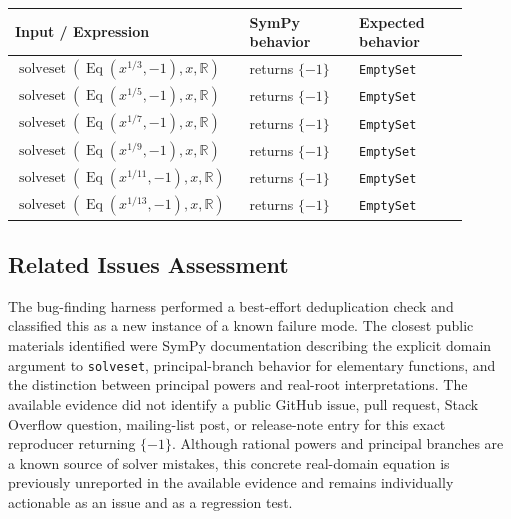 \documentclass[11pt]{article}
\begin{document}
\begin{center}
\small
\renewcommand{\arraystretch}{1.3}
\begin{tabular}{@{}>{\raggedright\arraybackslash}p{0.44\linewidth}>{\raggedright\arraybackslash}p{0.23\linewidth}>{\raggedright\arraybackslash}p{0.23\linewidth}@{}}
\toprule
\textbf{Input / Expression} & \textbf{SymPy behavior} & \textbf{Expected behavior} \\
\midrule
\(\operatorname{solveset}(\operatorname{Eq}(x^{1/3},-1),x,\mathbb{R})\) & returns \(\{-1\}\) & \texttt{EmptySet} \\
\(\operatorname{solveset}(\operatorname{Eq}(x^{1/5},-1),x,\mathbb{R})\) & returns \(\{-1\}\) & \texttt{EmptySet} \\
\(\operatorname{solveset}(\operatorname{Eq}(x^{1/7},-1),x,\mathbb{R})\) & returns \(\{-1\}\) & \texttt{EmptySet} \\
\(\operatorname{solveset}(\operatorname{Eq}(x^{1/9},-1),x,\mathbb{R})\) & returns \(\{-1\}\) & \texttt{EmptySet} \\
\(\operatorname{solveset}(\operatorname{Eq}(x^{1/11},-1),x,\mathbb{R})\) & returns \(\{-1\}\) & \texttt{EmptySet} \\
\(\operatorname{solveset}(\operatorname{Eq}(x^{1/13},-1),x,\mathbb{R})\) & returns \(\{-1\}\) & \texttt{EmptySet} \\
\bottomrule
\end{tabular}
\end{center}

\subsection{Related Issues Assessment}

The bug-finding harness performed a best-effort deduplication check and
classified this as a new instance of a known failure mode.  The closest public
materials identified were SymPy documentation describing the explicit domain
argument to \texttt{solveset}, principal-branch behavior for elementary
functions, and the distinction between principal powers and real-root
interpretations.  The available evidence did not identify a public GitHub
issue, pull request, Stack Overflow question, mailing-list post, or release-note
entry for this exact reproducer returning \(\{-1\}\).  Although rational powers
and principal branches are a known source of solver mistakes, this concrete
real-domain equation is previously unreported in the available evidence and
remains individually actionable as an issue and as a regression test.
\end{document}

